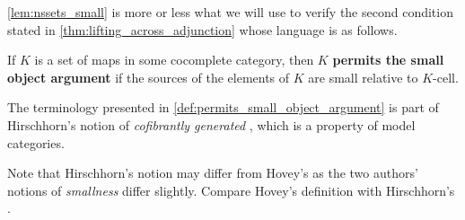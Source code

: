 \noindent \cref{lem:nssets_small} is more or less what we will use to verify the second condition stated in \cref{thm:lifting_across_adjunction} whose language is as follows.
\begin{definition}\label{def:permits_small_object_argument}
If $K$ is a set of maps in some cocomplete category, then $K$ \textbf{permits the small object argument} if the sources of the elements of $K$ are small relative to $K$-cell.
\end{definition}
\noindent The terminology presented in \cref{def:permits_small_object_argument} is part of Hirschhorn's notion of \emph{cofibrantly generated} \cite[Def.~11.1.2]{Hi03}, which is a property of model categories.

Note that Hirschhorn's notion may differ from Hovey's \cite[Def.~2.1.17]{Ho99} as the two authors' notions of \emph{smallness} differ slightly. Compare Hovey's definition \cite[Def.~2.1.3]{Ho99} with Hirschhorn's \cite[Def.~10.4.1]{Hi03}.

